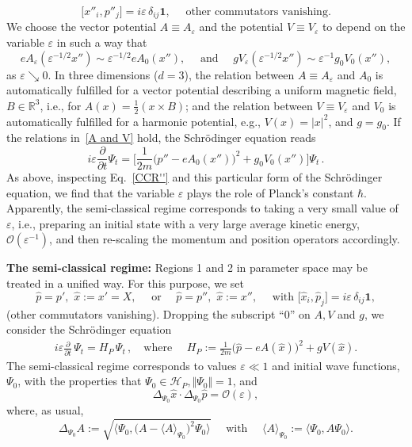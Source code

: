 \documentclass[12pt]{article}
\begin{document}
\begin{enumerate}
{\begin{equation}
\big[x''_i, p''_j \big] = i\varepsilon\, \delta_{ij} \mathbf{1}, \quad \text{ other commutators vanishing.}
\end{equation}
We choose the vector potential $A\equiv A_{\varepsilon}$ and the potential $V\equiv V_{\varepsilon}$ to depend 
on the variable $\varepsilon$ in such a way that
\begin{equation}\label{A and V}
eA_{\varepsilon}(\varepsilon^{-1/2}x'') \sim \varepsilon ^{-1/2}eA_{0}(x''),\quad \text{ and } \quad 
gV_{\varepsilon}(\varepsilon^{-1/2} x'') \sim \varepsilon ^{-1} g_{0}V_{0}(x''), 
\end{equation}
as $\varepsilon \searrow 0$. In three dimensions ($d=3$), the relation between $A\equiv A_{\varepsilon}$ and $A_0$ 
is automatically fulfilled for a vector potential describing a uniform magnetic field, $B \in \mathbb{R}^{3}$, i.e., for 
$A(x)= \frac{1}{2} (x \times B)$; and the relation between $V\equiv V_{\varepsilon}$ 
and $V_{0}$ is automatically fulfilled for a harmonic potential, e.g., $V(x)= \vert x \vert^{2}$, and $g= g_0$. 
If the relations in~\eqref{A and V} hold, the Schr\"odinger equation reads
$$i \varepsilon \frac{\partial}{\partial t} \Psi_t = \Big[\frac{1}{2m}\big(p'' - e A_{0}(x'')\big)^{2} + 
g_{0}V_{0}(x'') \Big] \Psi_t\,.$$
As above, inspecting Eq.~\eqref{CCR''} and this particular form of the Schr\"odinger equation, we find that the 
variable $\varepsilon$ plays the role of Planck's constant $\hbar$. Apparently, the semi-classical regime 
corresponds to taking a very small value of $\varepsilon$, i.e., preparing an initial state with a very large average kinetic energy, $\mathcal{O}(\varepsilon^{-1})$, and then re-scaling the momentum and  position operators accordingly.}
\end{enumerate}

\noindent
{\bf{The semi-classical regime:}} Regions 1 and 2 in parameter space may be treated in a unified way. For this purpose, we set 
\begin{equation}\label{CCR'''}
 \hat{p}= p', \,\,\hat{x}:=x'=X, \quad \text{ or } \quad\hat{p}=p'',\,\, \hat{x}:=x'', \quad \text{ with } 
 \big[\hat{x}_i, \hat{p}_j\big] = i \varepsilon\, \delta_{ij}\mathbf{1},
 \end{equation}
(other commutators vanishing). Dropping the subscript ``0'' on $A, V$ and $g$, we consider the Schr\"odinger equation
\begin{align}\label{Schrod}
i \varepsilon \frac{\partial}{\partial t}\, \Psi_t = H_{P}\, \Psi_t\,,  \quad\text{where }\quad H_{P}:=  \frac{1}{2m}\big(\hat{p} - eA(\hat{x})\big)^{2} + gV(\hat{x}).
\end{align}
The semi-classical regime corresponds to values $\varepsilon \ll 1$ and initial wave functions, $\Psi_0$, with 
the properties that $\Psi_0 \in \mathcal{H}_{P}, \Vert \Psi_0 \Vert =1$, and
\begin{equation}\label{Var}
 \Delta_{\Psi_0}\hat{x} \cdot \Delta_{\Psi_0} \hat{p} = \mathcal{O}(\varepsilon),
 \end{equation}
 where, as usual,
 $$\Delta_{\Psi_0}A:= \sqrt{\langle \Psi_0, \big(A- \langle A \rangle_{\Psi_0}\big)^{2} \Psi_0 \rangle} \quad \text{ with } \quad
\langle A\rangle_{\Psi_0}:= \langle \Psi_0, A \Psi_0 \rangle. $$
\end{document}
